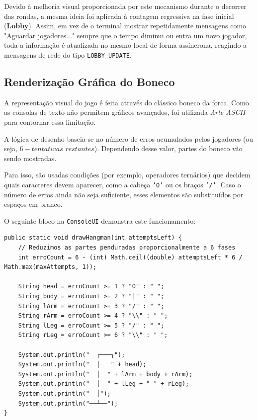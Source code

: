 \documentclass[11pt,a4paper,oneside]{report}
\begin{document}
Devido à melhoria visual proporcionada por este mecanismo durante o decorrer das rondas, a mesma ideia foi aplicada à contagem regressiva na fase inicial (\textbf{Lobby}). Assim, em vez de o terminal mostrar repetidamente mensagens como "Aguardar jogadores..." sempre que o tempo diminui ou entra um novo jogador, toda a informação é atualizada no mesmo local de forma assíncrona, reagindo a mensagens de rede do tipo \texttt{LOBBY\_UPDATE}.

\subsection{Renderização Gráfica do Boneco}
A representação visual do jogo é feita através do clássico boneco da forca. Como as consolas de texto não permitem gráficos avançados, foi utilizada \textit{Arte ASCII} para contornar essa limitação.

A lógica de desenho baseia-se no número de erros acumulados pelos jogadores (ou seja, $6 - \textit{tentativas restantes}$). Dependendo desse valor, partes do boneco vão sendo mostradas.

Para isso, são usadas condições (por exemplo, operadores ternários) que decidem quais caracteres devem aparecer, como a cabeça \texttt{'O'} ou os braços \texttt{'/'}. Caso o número de erros ainda não seja suficiente, esses elementos são substituídos por espaços em branco.

O seguinte bloco na \texttt{ConsoleUI} demonstra este funcionamento:

\begin{lstlisting}[caption={Rotina dinâmica de Renderização do Boneco em ASCII}]
public static void drawHangman(int attemptsLeft) {
    // Reduzimos as partes penduradas proporcionalmente a 6 fases
    int erroCount = 6 - (int) Math.ceil((double) attemptsLeft * 6 / Math.max(maxAttempts, 1));

    String head = erroCount >= 1 ? "O" : " ";
    String body = erroCount >= 2 ? "|" : " ";
    String lArm = erroCount >= 3 ? "/" : " ";
    String rArm = erroCount >= 4 ? "\\" : " ";
    String lLeg = erroCount >= 5 ? "/" : " ";
    String rLeg = erroCount >= 6 ? "\\" : " ";

    System.out.println("  ┌───┐");
    System.out.println("  │   " + head);
    System.out.println("  │  " + lArm + body + rArm);
    System.out.println("  │  " + lLeg + " " + rLeg);
    System.out.println("  │");
    System.out.println("──┴──");
}
\end{lstlisting}
\end{document}
